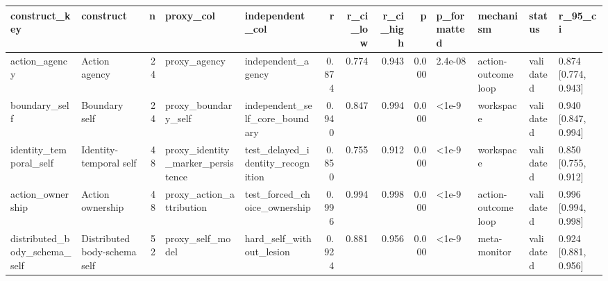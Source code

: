 \begin{tabular}{llrllrrrrllll}
\toprule
construct_key & construct & n & proxy_col & independent_col & r & r_ci_low & r_ci_high & p & p_formatted & mechanism & status & r_95_ci \\
\midrule
action_agency & Action agency & 24 & proxy_agency & independent_agency & 0.874 & 0.774 & 0.943 & 0.000 & 2.4e-08 & action-outcome loop & validated & 0.874 [0.774, 0.943] \\
boundary_self & Boundary self & 24 & proxy_boundary_self & independent_self_core_boundary & 0.940 & 0.847 & 0.994 & 0.000 & <1e-9 & workspace & validated & 0.940 [0.847, 0.994] \\
identity_temporal_self & Identity-temporal self & 48 & proxy_identity_marker_persistence & test_delayed_identity_recognition & 0.850 & 0.755 & 0.912 & 0.000 & <1e-9 & workspace & validated & 0.850 [0.755, 0.912] \\
action_ownership & Action ownership & 48 & proxy_action_attribution & test_forced_choice_ownership & 0.996 & 0.994 & 0.998 & 0.000 & <1e-9 & action-outcome loop & validated & 0.996 [0.994, 0.998] \\
distributed_body_schema_self & Distributed body-schema self & 52 & proxy_self_model & hard_self_without_lesion & 0.924 & 0.881 & 0.956 & 0.000 & <1e-9 & meta-monitor & validated & 0.924 [0.881, 0.956] \\
\bottomrule
\end{tabular}
